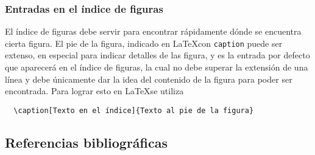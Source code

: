 
\subsubsection{Entradas en el índice de figuras}

El índice de figuras debe servir para encontrar rápidamente dónde se encuentra
cierta figura.  El pie de la figura, indicado en \LaTeX con \texttt{caption}
puede ser extenso, en especial para indicar detalles de las figura, y es la
entrada por defecto que aparecerá en el índice de figuras, la cual no debe
superar la extensión de una línea y debe únicamente dar la idea del contenido
de la figura para poder ser encontrada.  Para lograr esto en \LaTeX se utiliza
\begin{verbatim}
  \caption[Texto en el índice]{Texto al pie de la figura}
\end{verbatim}

\subsection{Referencias bibliográficas}




